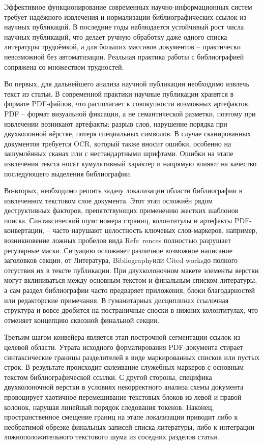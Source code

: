 Эффективное функционирование современных научно-информационных систем требует надёжного извлечения и нормализации библиографических ссылок из научных публикаций. В последние годы наблюдается устойчивый рост числа научных публикаций\cite{thelwall2022scopus}, что делает ручную обработку даже одного списка литературы трудоёмкой, а для больших массивов документов -- практически невозможной без автоматизации. Реальная практика работы с библиографией сопряжена со множеством трудностей.

Во первых, для дальнейшего анализа научной публикации необходимо извлечь текст из статьи. В современной практики научные публикации хранятся в формате PDF-файлов, что располагает к совокупности возможных артефактов. PDF -- формат визуальной фиксации, а не семантической разметки, поэтому при извлечении возникают артефакты: разрыв слов, нарушение порядка при двухколонной вёрстке, потеря специальных символов. В случае сканированных документов требуется OCR, который также вносит ошибки, особенно на зашумлённых сканах или с нестандартными шрифтами. Ошибки на этапе извлечения текста носят кумулятивный характер и напрямую влияют на качество последующего выделения библиографии.

Во-вторых, необходимо решить задачу локализации области библиографии в извлеченном текстовом слое документа. Этот этап осложнён рядом деструктивных факторов, препятствующих применению жестких шаблонов поиска. Синтаксический шум: номера страниц, колонтитулы и артефакты PDF-конвертации, -- часто нарушают целостность ключевых слов-маркеров, например, возникновение ложных пробелов вида \guillemotleft Refe~rences\guillemotright{} полностью разрушает регулярные маски. Ситуацию осложняет различное возможное написание заголовков секции, от \guillemotleft Литература\guillemotright, \guillemotleft Bibliography\guillemotright или \guillemotleft Cited works\guillemotright до полного отсуствия их в тексте публикации. При двухколоночном макете элементы верстки могут вклиниваться между основным текстом и финальным списком литературы, а сам раздел библиографии часто предваряет приложения, блоки благодарностей или редакторские примечания. В гуманитарных дисциплинах ссылочная структура и вовсе дробится на постраничные сноски в нижних колонтитулах, что отменяет концепцию сквозной финальной секции.

Третьим шагом конвейера является этап построчной сегментации ссылок из целевой области. Утрата исходного форматирования PDF-документа стирает синтаксические границы разделителей в виде маркированных списков или пустых строк. В результате происходит склеивание служебных маркеров с основным текстом библиографической ссылки. С другой стороны, специфика двухколоночной верстки в условиях некорректного анализа схемы документа провоцирует хаотичное перемешивание текстовых блоков из левой и правой колонок, нарушая линейный порядок следования токенов. Наконец, пространственное смещение границ на этапе локализации приводит либо к необратимой обрезке финальных записей списка литературы, либо к интеграции ложноположительного текстового шума из соседних разделов статьи.

